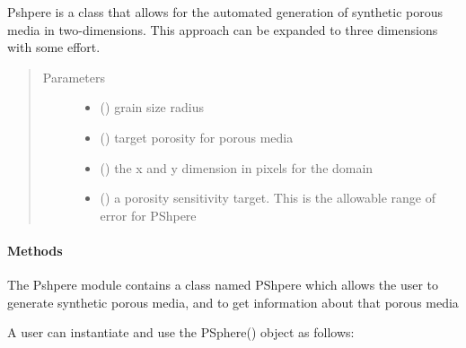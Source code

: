 \documentclass[letterpaper,10pt,english]{sphinxmanual}
\begin{document}
\begin{fulllineitems}
\label{\detokenize{index:lb_colloids.PSphere}}
Pshpere is a class that allows for the automated generation of
synthetic porous media in two-dimensions. This approach can be
expanded to three dimensions with some effort.
\begin{quote}\begin{description}
\item[{Parameters}] \leavevmode\begin{itemize}
\item {} 
 () \textendash{} grain size radius

\item {} 
 () \textendash{} target porosity for porous media

\item {} 
 () \textendash{} the x and y dimension in pixels for the domain

\item {} 
 () \textendash{} a porosity sensitivity target. This is the allowable range of error for PShpere

\end{itemize}

\end{description}\end{quote}
\paragraph{Methods}

\end{fulllineitems}

\label{\detokenize{index:module-lb_colloids.utilities.psphere}}
The Pshpere module contains a class named PShpere which allows the user to
generate synthetic porous media, and to get information about that porous
media

A user can instantiate and use the PSphere() object as follows:
\end{document}
